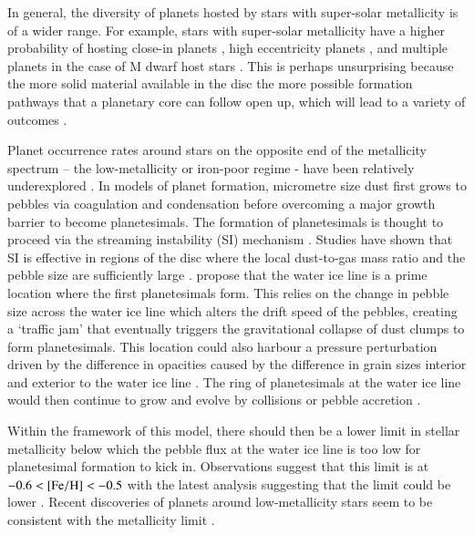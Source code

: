 \documentclass{aa}
\begin{document}
In general, the diversity of planets hosted by stars with super-solar metallicity is of a wider range. For example, stars with super-solar metallicity have a higher probability of hosting close-in planets \citep{Mulders2016,Dong2018}, high eccentricity planets \citep{Buchhave2018,Mills2019}, and multiple planets in the case of M dwarf host stars \citep{RodriguezMartinez2023}. This is perhaps unsurprising because the more solid material available in the disc the more possible formation pathways that a planetary core can follow open up, which will lead to a variety of outcomes \citep[e.g.][]{Lambrechts2019}.

Planet occurrence rates around stars on the opposite end of the metallicity spectrum – the low-metallicity or iron-poor regime - have been relatively underexplored \citep{Mortier2012,Boley2021}. In models of planet formation, micrometre size dust first grows to pebbles via coagulation and condensation \citep{Zsom2010,Ciesla2010,Birnstiel2012,Ros2013} before overcoming a major growth barrier to become planetesimals. The formation of planetesimals is thought to proceed via the streaming instability (SI) mechanism \citep[e.g.][]{YoudinGoodman2005}. Studies have shown that SI is effective in regions of the disc where the local dust-to-gas mass ratio and the pebble size are sufficiently large \citep[e.g.][]{Carrera2015,Yang2017,LiYoudin2021}. \citet{DrazkowskaAlibert2017} propose that the water ice line is a prime location where the first planetesimals form. This relies on the change in pebble size across the water ice line which alters the drift speed of the pebbles, creating a ‘traffic jam’ that eventually triggers the gravitational collapse of dust clumps to form planetesimals. This location could also harbour a pressure perturbation driven by the difference in opacities caused by the difference in grain sizes interior and exterior to the water ice line \citep{Muller2021}. The ring of planetesimals at the water ice line would then continue to grow and evolve by collisions or pebble accretion \citep{BatyginMorbidelli2023,Woo2023}. 

Within the framework of this model, there should then be a lower limit in stellar metallicity below which the pebble flux at the water ice line is too low for planetesimal formation to kick in. Observations suggest that this limit is at $-0.6 < {\rm [Fe/H]} < -0.5$ \citep{Mortier2012} with the latest analysis suggesting that the limit could be lower \citep[between $-0.7$ and $-0.6$;][]{Boley2021}. Recent discoveries of planets around low-metallicity stars seem to be consistent with the metallicity limit \citep[e.g.][]{Hellier2014,Polanski2021,Brinkman2023,Dai2023}. 
\end{document}
